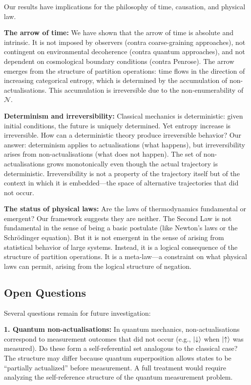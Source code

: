 \documentclass[twocolumn,10pt]{article}
\theoremstyle{definition}
\theoremstyle{remark}
\begin{document}
Our results have implications for the philosophy of time, causation, and physical law.

\textbf{The arrow of time:} We have shown that the arrow of time is absolute and intrinsic. It is not imposed by observers (contra coarse-graining approaches), not contingent on environmental decoherence (contra quantum approaches), and not dependent on cosmological boundary conditions (contra Penrose). The arrow emerges from the structure of partition operations: time flows in the direction of increasing categorical entropy, which is determined by the accumulation of non-actualisations. This accumulation is irreversible due to the non-enumerability of $\mathcal{N}$.

\textbf{Determinism and irreversibility:} Classical mechanics is deterministic: given initial conditions, the future is uniquely determined. Yet entropy increase is irreversible. How can a deterministic theory produce irreversible behavior? Our answer: determinism applies to actualisations (what happens), but irreversibility arises from non-actualisations (what does not happen). The set of non-actualisations grows monotonically even though the actual trajectory is deterministic. Irreversibility is not a property of the trajectory itself but of the context in which it is embedded—the space of alternative trajectories that did not occur.

\textbf{The status of physical laws:} Are the laws of thermodynamics fundamental or emergent? Our framework suggests they are neither. The Second Law is not fundamental in the sense of being a basic postulate (like Newton's laws or the Schrödinger equation). But it is not emergent in the sense of arising from statistical behavior of large systems. Instead, it is a logical consequence of the structure of partition operations. It is a meta-law—a constraint on what physical laws can permit, arising from the logical structure of negation.

\subsection{Open Questions}

Several questions remain for future investigation:

\textbf{1. Quantum non-actualisations:} In quantum mechanics, non-actualisations correspond to measurement outcomes that did not occur (e.g., $\ket{\downarrow}$ when $\ket{\uparrow}$ was measured). Do these form a self-referential set analogous to the classical case? The structure may differ because quantum superposition allows states to be ``partially actualized'' before measurement. A full treatment would require analyzing the self-reference structure of the quantum measurement problem.
\end{document}
